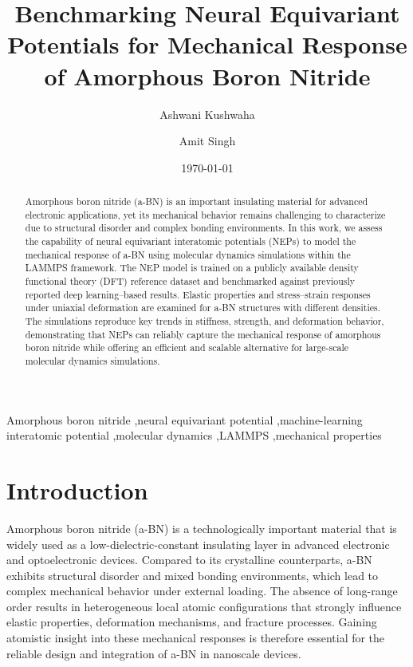 \documentclass[review, 12pt]{elsarticle}
\numberwithin{equation}{section}
\begin{document}
\begin{frontmatter}

\title{Benchmarking Neural Equivariant Potentials for Mechanical Response of Amorphous Boron Nitride}

\author{Ashwani Kushwaha}
\author{Amit Singh}
\address{Department of Mechanical Engineering, IIT Bombay, Mumbai 400076, India}


\date{\today}

\begin{abstract}
Amorphous boron nitride (a-BN) is an important insulating material for advanced electronic applications, yet its mechanical behavior remains challenging to characterize due to structural disorder and complex bonding environments. In this work, we assess the capability of neural equivariant interatomic potentials (NEPs) to model the mechanical response of a-BN using molecular dynamics simulations within the LAMMPS framework. The NEP model is trained on a publicly available density functional theory (DFT) reference dataset and benchmarked against previously reported deep learning--based results. Elastic properties and stress--strain responses under uniaxial deformation are examined for a-BN structures with different densities. The simulations reproduce key trends in stiffness, strength, and deformation behavior, demonstrating that NEPs can reliably capture the mechanical response of amorphous boron nitride while offering an efficient and scalable alternative for large-scale molecular dynamics simulations.
\end{abstract}

\begin{keyword}
Amorphous boron nitride \sep neural equivariant potential \sep machine-learning interatomic potential \sep molecular dynamics \sep LAMMPS \sep mechanical properties
\end{keyword}


\end{frontmatter}

\section{Introduction}

Amorphous boron nitride (a-BN) is a technologically important material that is widely used as a low-dielectric-constant insulating layer in advanced electronic and optoelectronic devices. Compared to its crystalline counterparts, a-BN exhibits structural disorder and mixed bonding environments, which lead to complex mechanical behavior under external loading. The absence of long-range order results in heterogeneous local atomic configurations that strongly influence elastic properties, deformation mechanisms, and fracture processes. Gaining atomistic insight into these mechanical responses is therefore essential for the reliable design and integration of a-BN in nanoscale devices.
\end{document}
